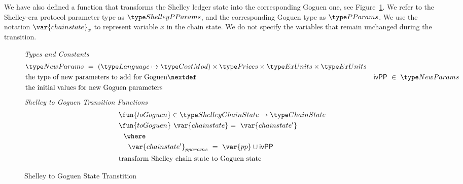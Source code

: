 We have also defined a function that transforms the Shelley ledger state into
the corresponding Goguen one, see Figure~\ref{fig:functions:to-shelley}. We
refer to the Shelley-era protocol parameter type as $\ShelleyPParams$, and the corresponding Goguen
type as $\PParams$. We use the notation $\var{chainstate}_{x}$ to represent
variable $x$ in the chain state. We do not specify the variables that
remain unchanged during the transition.

\begin{figure}[htb]
  \emph{Types and Constants}
  \begin{align*}
      & \NewParams ~=~ (\Language \mapsto \CostMod) \times \Prices \times \ExUnits \times \ExUnits \\
      & \text{the type of new parameters to add for Goguen}
      \nextdef
      & \mathsf{ivPP} ~\in~ \NewParams \\
      & \text{the initial values for new Goguen parameters}
  \end{align*}
  \emph{Shelley to Goguen Transition Functions}
  \begin{align*}
      & \fun{toGoguen} \in \ShelleyChainState \to \ChainState \\
      & \fun{toGoguen}~\var{chainstate} =~\var{chainstate'} \\
      &~~\where \\
      &~~~~\var{chainstate'}_{pparams}~=~\var{pp}\cup \mathsf{ivPP}\\
      & \text{transform Shelley chain state to Goguen state}
  \end{align*}
  \caption{Shelley to Goguen State Transtition}
  \label{fig:functions:to-shelley}
\end{figure}
